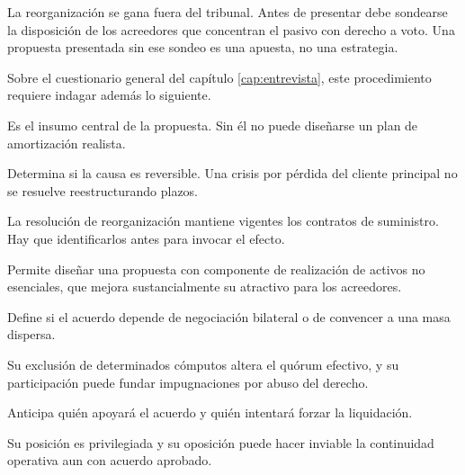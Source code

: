 \begin{foco}
La reorganización se gana fuera del tribunal. Antes de presentar debe sondearse la
disposición de los acreedores que concentran el pasivo con derecho a voto. Una propuesta
presentada sin ese sondeo es una apuesta, no una estrategia.
\end{foco}

\bloqueEntrevista

Sobre el cuestionario general del capítulo \ref{cap:entrevista}, este procedimiento
requiere indagar además lo siguiente.

\begin{cuestionario}
  {Es el insumo central de la propuesta. Sin él no puede diseñarse un plan de
  amortización realista.}

  {Determina si la causa es reversible. Una crisis por pérdida del cliente principal no
  se resuelve reestructurando plazos.}

  {La resolución de reorganización mantiene vigentes los contratos de suministro. Hay que
  identificarlos antes para invocar el efecto.}

  {Permite diseñar una propuesta con componente de realización de activos no esenciales,
  que mejora sustancialmente su atractivo para los acreedores.}
\end{cuestionario}

\begin{cuestionario}
  {Define si el acuerdo depende de negociación bilateral o de convencer a una masa
  dispersa.}

  {Su exclusión de determinados cómputos altera el quórum efectivo, y su participación
  puede fundar impugnaciones por abuso del derecho.}

  {Anticipa quién apoyará el acuerdo y quién intentará forzar la liquidación.}

  {Su posición es privilegiada y su oposición puede hacer inviable la continuidad
  operativa aun con acuerdo aprobado.}
\end{cuestionario}

